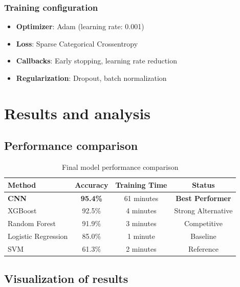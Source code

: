 \documentclass[11pt]{article}
\begin{document}
\subsubsection{Training configuration}
\begin{itemize}
    \item \textbf{Optimizer}: Adam (learning rate: 0.001)
    \item \textbf{Loss}: Sparse Categorical Crossentropy
    \item \textbf{Callbacks}: Early stopping, learning rate reduction
    \item \textbf{Regularization}: Dropout, batch normalization
\end{itemize}

\section{Results and analysis}

\subsection{Performance comparison}

\begin{table}[H]
\centering
\caption{Final model performance comparison}
\begin{tabular}{lccc}
\toprule
\textbf{Method} & \textbf{Accuracy} & \textbf{Training Time} & \textbf{Status} \\
\midrule
\textbf{CNN} & \textbf{95.4\%} & 61 minutes & \textbf{Best Performer} \\
XGBoost & 92.5\% & 4 minutes & Strong Alternative \\
Random Forest & 91.9\% & 3 minutes & Competitive \\
Logistic Regression & 85.0\% & 1 minute & Baseline \\
SVM & 61.3\% & 2 minutes & Reference \\
\bottomrule
\end{tabular}
\end{table}

\subsection{Visualization of results}
\end{document}
